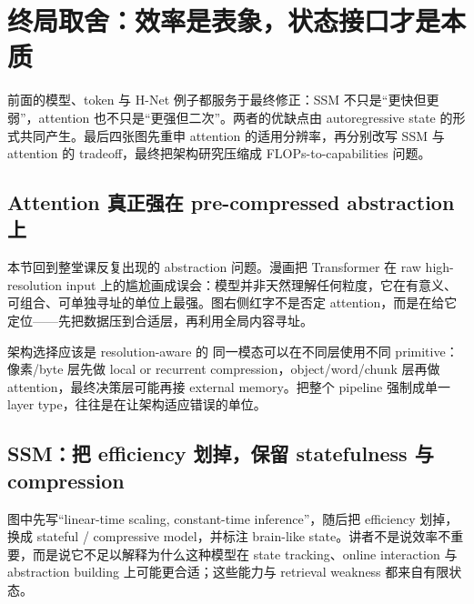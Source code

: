 \section{终局取舍：效率是表象，状态接口才是本质}

前面的模型、token 与 H-Net 例子都服务于最终修正：SSM 不只是“更快但更弱”，attention 也不只是“更强但二次”。两者的优缺点由 autoregressive state 的形式共同产生。最后四张图先重申 attention 的适用分辨率，再分别改写 SSM 与 attention 的 tradeoff，最终把架构研究压缩成 FLOPs-to-capabilities 问题。

\subsection{Attention 真正强在 pre-compressed abstraction 上}

本节回到整堂课反复出现的 abstraction 问题。漫画把 Transformer 在 raw high-resolution input 上的尴尬画成误会：模型并非天然理解任何粒度，它在有意义、可组合、可单独寻址的单位上最强。图右侧红字不是否定 attention，而是在给它定位——先把数据压到合适层，再利用全局内容寻址。


\begin{importantbox}{架构选择应该是 resolution-aware 的}
同一模态可以在不同层使用不同 primitive：像素/byte 层先做 local or recurrent compression，object/word/chunk 层再做 attention，最终决策层可能再接 external memory。把整个 pipeline 强制成单一 layer type，往往是在让架构适应错误的单位。
\end{importantbox}

\subsection{SSM：把 efficiency 划掉，保留 statefulness 与 compression}

图中先写“linear-time scaling, constant-time inference”，随后把 efficiency 划掉，换成 stateful / compressive model，并标注 brain-like state。讲者不是说效率不重要，而是说它不足以解释为什么这种模型在 state tracking、online interaction 与 abstraction building 上可能更合适；这些能力与 retrieval weakness 都来自有限状态。



